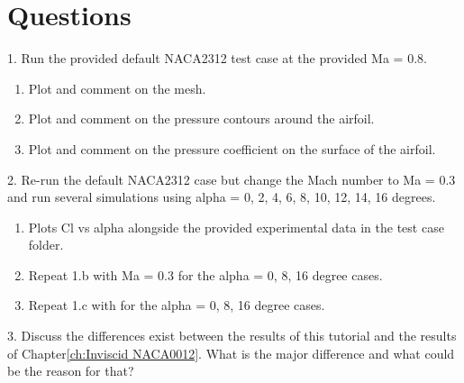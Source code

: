 \section{Questions}
1. Run the provided default NACA2312 test case at the provided Ma = 0.8.
\begin{enumerate}[label=(\alph*)]
    \item Plot and comment on the mesh.
    \item Plot and comment on the pressure contours around the airfoil.
    \item Plot and comment on the pressure coefficient on the surface of the airfoil.
\end{enumerate}
2. Re-run the default NACA2312 case but change the Mach number to Ma = 0.3 and run several simulations using alpha = 0, 2, 4, 6, 8, 10, 12, 14, 16 degrees.
\begin{enumerate}[label=(\alph*)]
    \item Plots Cl vs alpha alongside the provided experimental data \cite{ladson1988effects} in the test case folder.
    \item Repeat 1.b with Ma = 0.3 for the alpha = 0, 8, 16 degree cases.
    \item Repeat 1.c with for the alpha = 0, 8, 16 degree cases.
\end{enumerate}
3. Discuss the differences exist between the results of this tutorial and the results of Chapter\ref{ch:Inviscid NACA0012}. What is the major difference and what could be the reason for that?

